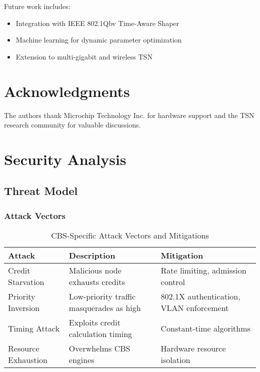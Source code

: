 \documentclass[10pt, journal, compsoc]{IEEEtran}
\begin{document}
Future work includes:
\begin{itemize}
    \item Integration with IEEE 802.1Qbv Time-Aware Shaper
    \item Machine learning for dynamic parameter optimization
    \item Extension to multi-gigabit and wireless TSN
\end{itemize}

\section{Acknowledgments}

The authors thank Microchip Technology Inc. for hardware support and the TSN research community for valuable discussions.




\section{Security Analysis}

\subsection{Threat Model}

\subsubsection{Attack Vectors}

\begin{table}[H]
\centering
\caption{CBS-Specific Attack Vectors and Mitigations}
\begin{tabular}{|l|p{5cm}|p{5cm}|}
\hline
\textbf{Attack} & \textbf{Description} & \textbf{Mitigation} \\
\hline
Credit Starvation & Malicious node exhausts credits & Rate limiting, admission control \\
\hline
Priority Inversion & Low-priority traffic masquerades as high & 802.1X authentication, VLAN enforcement \\
\hline
Timing Attack & Exploits credit calculation timing & Constant-time algorithms \\
\hline
Resource Exhaustion & Overwhelms CBS engines & Hardware resource isolation \\
\hline
\end{tabular}
\end{table}
\end{document}
